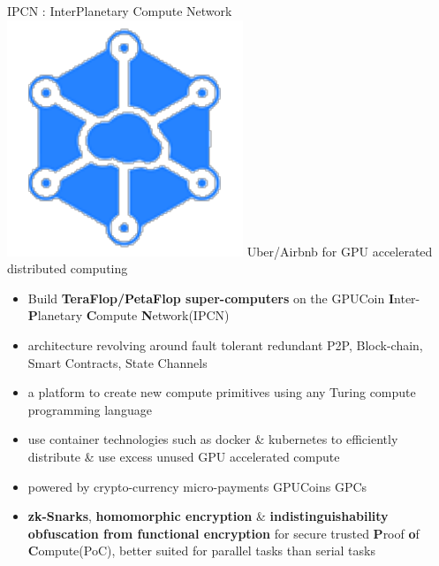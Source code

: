 \begin{frame}[t]{IPCN
	: InterPlanetary Compute Network}
	\includegraphics[scale=.15]{./static/ipcn-p2p.pdf}
	 Uber/Airbnb for GPU accelerated distributed computing
 \begin{itemize}[<+-| alert@+>]
 \item Build \textbf{TeraFlop/PetaFlop super-computers} on the GPUCoin \textbf{I}nter-\textbf{P}lanetary \textbf{C}ompute \textbf{N}etwork(IPCN)
 \item architecture revolving around fault tolerant redundant P2P, Block-chain, Smart Contracts, State Channels
 \item a platform to create new compute primitives using any Turing compute programming language
 \item use container technologies such as docker \& kubernetes to efficiently distribute \& use excess unused GPU accelerated compute
 \item powered by crypto-currency micro-payments GPUCoins GPCs
 \item \textbf{zk-Snarks}, \textbf{homomorphic encryption} \& \textbf{indistinguishability obfuscation from functional encryption} for secure trusted \textbf{P}roof \textbf{o}f \textbf{C}ompute(PoC), better suited for parallel tasks than serial tasks
 \end{itemize}
\end{frame}